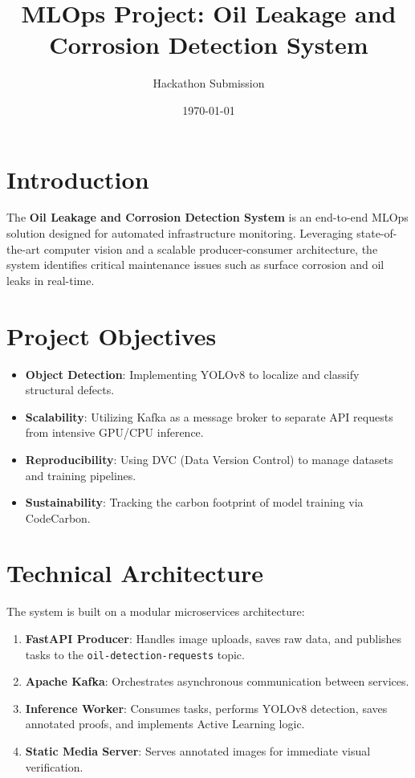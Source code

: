 \documentclass[12pt,a4paper]{article}
\title{MLOps Project: Oil Leakage and Corrosion Detection System}
\author{Hackathon Submission}
\date{\today}
\begin{document}
\maketitle

\section{Introduction}
The \textbf{Oil Leakage and Corrosion Detection System} is an end-to-end MLOps solution designed for automated infrastructure monitoring. Leveraging state-of-the-art computer vision and a scalable producer-consumer architecture, the system identifies critical maintenance issues such as surface corrosion and oil leaks in real-time.

\section{Project Objectives}
\begin{itemize}
    \item \textbf{Object Detection}: Implementing YOLOv8 to localize and classify structural defects.
    \item \textbf{Scalability}: Utilizing Kafka as a message broker to separate API requests from intensive GPU/CPU inference.
    \item \textbf{Reproducibility}: Using DVC (Data Version Control) to manage datasets and training pipelines.
    \item \textbf{Sustainability}: Tracking the carbon footprint of model training via CodeCarbon.
\end{itemize}

\section{Technical Architecture}
The system is built on a modular microservices architecture:
\begin{enumerate}
    \item \textbf{FastAPI Producer}: Handles image uploads, saves raw data, and publishes tasks to the \texttt{oil-detection-requests} topic.
    \item \textbf{Apache Kafka}: Orchestrates asynchronous communication between services.
    \item \textbf{Inference Worker}: Consumes tasks, performs YOLOv8 detection, saves annotated proofs, and implements Active Learning logic.
    \item \textbf{Static Media Server}: Serves annotated images for immediate visual verification.
\end{enumerate}
\end{document}
